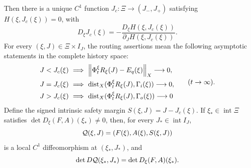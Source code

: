 \begin{theorem}
Then there is a unique \(C^1\) function
\(J_c:\Xi\to(J_-,J_+)\) satisfying \(H(\xi,J_c(\xi))=0\), with
\begin{equation}
 D_\xi J_c(\xi)
 =-\frac{D_\xi H(\xi,J_c(\xi))}
          {\partial_JH(\xi,J_c(\xi))}.                 \label{eq:threshold-derivative}
\end{equation}
For every \((\xi,J)\in\Xi\times I_J\), the routing assertions mean the
following asymptotic statements in the complete history space:
\begin{equation}
 \begin{aligned}
 J<J_c(\xi)&\ \Longrightarrow\
   \left\lVert\Phi_t^\xi R_\xi(J)-E_q(\xi)\right\rVert_X\longrightarrow0,\\
 J=J_c(\xi)&\ \Longrightarrow\
   \operatorname{dist}_X(\Phi_t^\xi R_\xi(J),\Gamma_i(\xi))
      \longrightarrow0,\\
 J>J_c(\xi)&\ \Longrightarrow\
   \operatorname{dist}_X(\Phi_t^\xi R_\xi(J),\Gamma_o(\xi))
      \longrightarrow0
 \end{aligned}
 \qquad(t\to\infty).                                  \label{eq:routing}
\end{equation}
Define the signed intrinsic safety margin
\(S(\xi,J)=J-J_c(\xi)\).  If
\(\xi_*\in\operatorname{int}\Xi\) satisfies
\(\det D_\xi(F,A)(\xi_*)\ne0\), then, for every
\(J_*\in\operatorname{int}I_J\),
\begin{equation}
 \mathcal Q(\xi,J)=(F(\xi),A(\xi),S(\xi,J))                 \label{eq:safety-map}
\end{equation}
is a local \(C^1\) diffeomorphism at \((\xi_*,J_*)\), and
\begin{equation}
 \det D\mathcal Q(\xi_*,J_*)=\det D_\xi(F,A)(\xi_*).        \label{eq:safety-determinant}
\end{equation}
\end{theorem}

